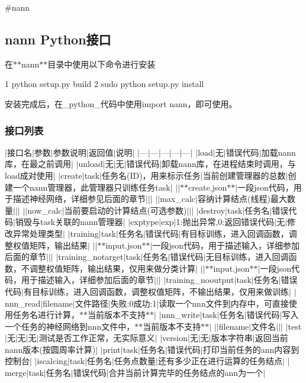 \#nann

\subsection*{nann Python接口}

在$\ast$$\ast$nann$\ast$$\ast$目录中使用以下命令进行安装 
\begin{DoxyCode}
1 python setup.py build
2 sudo python setup.py install
\end{DoxyCode}
 安装完成后，在\+\_\+python\+\_\+代码中使用{\ttfamily import nann}，即可使用。

\subsubsection*{接口列表}

$\vert$接口名$\vert$参数$\vert$参数说明$\vert$返回值$\vert$说明$\vert$ $\vert$---$\vert$---$\vert$---$\vert$---$\vert$---$\vert$ $\vert$load$\vert$无$\vert$错误代码$\vert$加载nann库，在最之前调用$\vert$ $\vert$unload$\vert$无$\vert$无$\vert$错误代码$\vert$卸载nann库，在进程结束时调用，与load成对使用$\vert$ $\vert$create$\vert$task$\vert$任务名(I\+D)，用来标示任务$\vert$当前创建管理器的总数$\vert$创建一个nann管理器，此管理器只训练任务task$\vert$ $\vert$$\vert$$\ast$$\ast$create.json$\ast$$\ast$$\vert$一段json代码，用于描述神经网络，详细参见后面的章节$\vert$$\vert$$\vert$ $\vert$$\vert$max\+\_\+calc$\vert$容纳计算结点(线程)最大数量$\vert$$\vert$$\vert$ $\vert$$\vert$now\+\_\+calc$\vert$当前要启动的计算结点(可选参数)$\vert$$\vert$$\vert$ $\vert$destroy$\vert$task$\vert$任务名$\vert$错误代码$\vert$销毁与task关联的nann管理器$\vert$ $\vert$exptype$\vert$exp$\vert$1\+:抛出异常,0\+:返回错误代码$\vert$无$\vert$修改异常处理类型$\vert$ $\vert$training$\vert$task$\vert$任务名$\vert$错误代码$\vert$有目标训练，进入回调函数，调整权值矩阵，输出结果$\vert$ $\vert$$\vert$$\ast$$\ast$input.json$\ast$$\ast$$\vert$一段json代码，用于描述输入，详细参加后面的章节$\vert$$\vert$$\vert$ $\vert$training\+\_\+notarget$\vert$task$\vert$任务名$\vert$错误代码$\vert$无目标训练，进入回调函数，不调整权值矩阵，输出结果，仅用来做分类计算$\vert$ $\vert$$\vert$$\ast$$\ast$input.json$\ast$$\ast$$\vert$一段json代码，用于描述输入，详细参加后面的章节$\vert$$\vert$$\vert$ $\vert$training\+\_\+nooutput$\vert$task$\vert$任务名$\vert$错误代码$\vert$有目标训练，进入回调函数，调整权值矩阵，不输出结果，仅用来做训练$\vert$ $\vert$nnn\+\_\+read$\vert$filename$\vert$文件路径$\vert$失败\+:0成功\+:1$\vert$读取一个nnn文件到内存中，可直接使用任务名进行计算，$\ast$$\ast$当前版本不支持$\ast$$\ast$$\vert$ $\vert$nnn\+\_\+write$\vert$task$\vert$任务名$\vert$错误代码$\vert$写入一个任务的神经网络到nnn文件中，$\ast$$\ast$当前版本不支持$\ast$$\ast$$\vert$ $\vert$$\vert$filename$\vert$文件名$\vert$$\vert$$\vert$ $\vert$test$\vert$无$\vert$无$\vert$无$\vert$测试是否工作正常，无实际意义$\vert$ $\vert$version$\vert$无$\vert$无$\vert$版本字符串$\vert$返回当前nann版本(按圆周率计算)$\vert$ $\vert$print$\vert$task$\vert$任务名$\vert$错误代码$\vert$打印当前任务的ann内容到控制台$\vert$ $\vert$iscalcing$\vert$task$\vert$任务名$\vert$任务点数量$\vert$还有多少正在进行运算的任务结点$\vert$ $\vert$merge$\vert$task$\vert$任务名$\vert$错误代码$\vert$合并当前计算完毕的任务结点的ann为一个$\vert$

